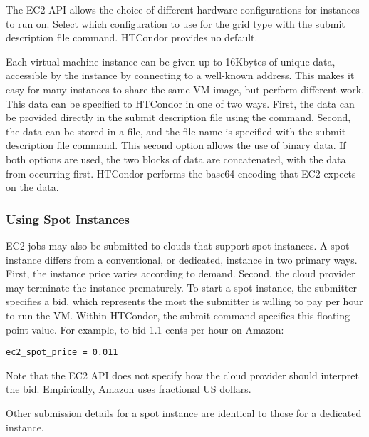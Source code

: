 The EC2 API allows the choice of different hardware configurations 
for instances to run on.
Select which configuration to use for the  grid type
with the  submit description file command.
HTCondor provides no default.

Each virtual machine instance can be given up to 16Kbytes of unique data, 
accessible by the instance by connecting to a well-known address.
This makes it easy for many instances to share the same VM image,
but perform different work.
This data can be specified to HTCondor in one of two ways.
First, the data can be provided directly in the submit description file 
using the  command.
Second, the data can be
stored in a file, and the file name is specified with the
 submit description file command.
This second option allows the use of binary data.
If both options are used, the two blocks of
data are concatenated, with the data from  
occurring first.  HTCondor performs the base64 encoding that EC2 expects on 
the data.

\subsubsection{\label{sec:spot-instances}Using Spot Instances}

EC2 jobs may also be submitted to clouds that support spot instances.
A spot instance differs from a conventional, or dedicated, instance in two
primary ways.
First, the instance price varies according to demand.
Second,
the cloud provider may terminate the instance prematurely.
To start a spot instance,
the submitter specifies a bid,
which represents the most the submitter is willing to pay per hour
to run the VM.
Within HTCondor, the submit command 
specifies this floating point value.
For example, 
to bid 1.1 cents per hour on Amazon:

\begin{verbatim}
ec2_spot_price = 0.011
\end{verbatim}

Note that the EC2 API does not specify how the cloud provider 
should interpret the bid.
Empirically, Amazon uses fractional US dollars.

Other submission details for a spot instance are identical to those
for a dedicated instance.

